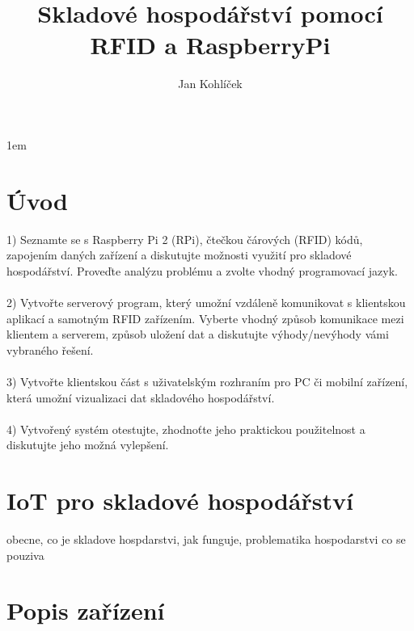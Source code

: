 \documentclass{bakalarka}
\author{Jan Kohlíček}
\title{Skladové hospodářství pomocí RFID a RaspberryPi}
\begin{document}
\pagestyle{fancy}
\renewcommand{\chaptermark}[1]{\markboth{\textit{#1}}{}}
\renewcommand{\sectionmark}[1]{\markright{\textit{#1}}{}}
\cfoot{\thepage}
\lhead{\leftmark}
\rhead{\rightmark}
\maketitle

\tableofcontents
\pagestyle{fancy}
\renewcommand{\chaptermark}[1]{\markboth{\textit{#1}}{}}
\renewcommand{\sectionmark}[1]{\markright{\textit{#1}}{}}
\cfoot{\thepage}
\lhead{\leftmark}
\rhead{\rightmark}
\parskip 1em




\chapter{Úvod}

1) Seznamte se s Raspberry Pi 2 (RPi), čtečkou čárových (RFID) kódů, zapojením daných zařízení a diskutujte možnosti využití pro skladové hospodářství. Proveďte analýzu problému a zvolte vhodný programovací jazyk.\\
\\
2) Vytvořte serverový program, který umožní vzdáleně komunikovat s klientskou aplikací a samotným RFID zařízením.
Vyberte vhodný způsob komunikace mezi klientem a serverem, způsob uložení dat a diskutujte výhody/nevýhody vámi vybraného řešení.\\
\\
3) Vytvořte klientskou část s uživatelským rozhraním pro PC či mobilní zařízení, která umožní vizualizaci dat skladového hospodářství.\\
\\
4) Vytvořený systém otestujte, zhodnoťte jeho praktickou použitelnost a diskutujte jeho možná vylepšení.

\chapter{IoT pro skladové hospodářství}
obecne, co je skladove hospdarstvi,
jak funguje, problematika hospodarstvi
co se pouziva


\chapter{Popis zařízení}
\end{document}
